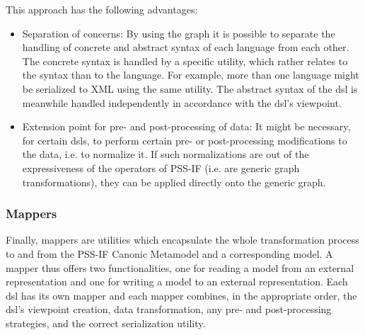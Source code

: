 This approach has the following advantages:

\begin{itemize}
\item Separation of concerns: By using the graph it is possible to separate the handling of concrete and abstract syntax of each language from each other. The concrete syntax is handled by a specific utility, which rather relates to the syntax than to the language. For example, more than one language might be serialized to XML using the same utility. The abstract syntax of the \gls{dsl} is meanwhile handled independently in accordance with the \gls{dsl}'s viewpoint.
\item Extension point for pre- and post-processing of data: It might be necessary, for certain \glspl{dsl}, to perform certain pre- or post-processing modifications to the data, i.e. to normalize it. If such normalizations are out of the expressiveness of the operators of PSS-IF (i.e. are generic graph transformations), they can be applied directly onto the generic graph.
\end{itemize}

\subsubsection{Mappers}

Finally, mappers are utilities which encapsulate the whole transformation process to and from the PSS-IF Canonic Metamodel and a corresponding model. A mapper thus offers two functionalities, one for reading a model from an external representation and one for writing a model to an external representation. Each \gls{dsl} has its own mapper and each mapper combines, in the appropriate order, the \gls{dsl}'s viewpoint creation, data transformation, any pre- and post-processing strategies, and the correct serialization utility.